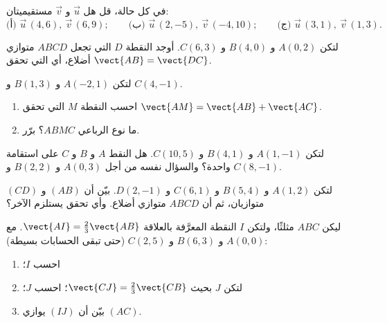 \begin{exercise}[$\star$]\label{exo:g10:vectors:4}
في كل حالة، قل هل $\vec u$ و $\vec v$ مستقيميتان:
\[
\text{(أ) } \vec u\,(4, 6),\ \vec v\,(6, 9);
\qquad
\text{(ب) } \vec u\,(2, -5),\ \vec v\,(-4, 10);
\qquad
\text{(ج) } \vec u\,(3, 1),\ \vec v\,(1, 3).
\]
\end{exercise}

\begin{exercise}[$\star$]\label{exo:g10:vectors:5}
لتكن $A(0, 2)$ و $B(4, 0)$ و $C(6, 3)$. أوجد  النقطة
$D$ التي تجعل $ABCD$ متوازي أضلاع، أي التي تحقق
$\vect{AB} = \vect{DC}$.
\end{exercise}

\begin{exercise}[$\star\star$]\label{exo:g10:vectors:6}
لتكن $A(-2, 1)$ و $B(1, 3)$ و $C(4, -1)$.
\begin{enumerate}
  \item احسب  النقطة $M$ التي تحقق
        $\vect{AM} = \vect{AB} + \vect{AC}$.
  \item ما نوع الرباعي $ABMC$؟ برّر.
\end{enumerate}
\end{exercise}

\begin{exercise}[$\star\star$]\label{exo:g10:vectors:7}
لتكن $A(1, -1)$ و $B(4, 1)$ و $C(10, 5)$. هل النقط $A$ و $B$ و $C$
على استقامة واحدة؟ والسؤال نفسه من أجل $A(0, 3)$ و $B(2, 2)$ و $C(8, -1)$.
\end{exercise}

\begin{exercise}[$\star\star$]\label{exo:g10:vectors:8}
لتكن $A(1, 2)$ و $B(5, 4)$ و $C(6, 1)$ و $D(2, -1)$. بيّن أن $(AB)$ و
$(CD)$ متوازيان، ثم أن $ABCD$ متوازي أضلاع. وأي
تحقق يستلزم الآخر؟
\end{exercise}

\begin{exercise}[$\star\star$]\label{exo:g10:vectors:9}
ليكن $ABC$ مثلثًا، ولتكن $I$ النقطة المعرَّفة بالعلاقة
$\vect{AI} = \frac23 \vect{AB}$. مع $A(0,0)$ و $B(6, 3)$ و $C(2, 5)$
(حتى تبقى الحسابات بسيطة):
\begin{enumerate}
  \item احسب  $I$؛
  \item لتكن $J$ بحيث $\vect{CJ} = \frac23\vect{CB}$؛ احسب
         $J$؛
  \item بيّن أن $(IJ)$ يوازي $(AC)$.
\end{enumerate}
\end{exercise}

